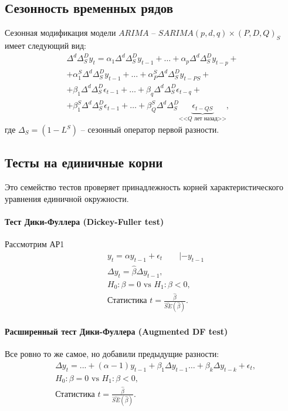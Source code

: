     \subsection{Сезонность временных рядов}
        Сезонная модификация модели $ARIMA$ -- $SARIMA(p, d, q)\times (P, D, Q)_S$ имеет следующий вид:
        \begin{multline}
            \Delta^d \Delta_S^D y_{t} =
                    \alpha_1 \Delta^d \Delta_S^D y_{t-1} + \dots + \alpha_p \Delta^d \Delta_S^D y_{t-p} + \\ +
                    \alpha_1^S \Delta^d \Delta_S^D y_{t-1} + \dots + \alpha_P^S \Delta^d \Delta_S^Dy_{t-PS} + \\ +
                    \beta_1 \Delta^d \Delta_S^D \epsilon_{t-1} + \dots + \beta_q \Delta^d \Delta_S^D \epsilon_{t-q} + \\ +
                    \beta_1^S \Delta^d \Delta_S^D \epsilon_{t-1} + \dots + \beta_Q^S \Delta^d \Delta_S^D \underbrace{\epsilon_{t-QS}}_{\text{<<$Q$ лет назад>>}},
        \end{multline} 
        где $\Delta_S = (1-L^S)$ -- сезонный оператор первой разности. 

    \subsection{Тесты на единичные корни}
        Это семейство тестов проверяет принадлежность корней характеристического уравнения единичной окружности.

        \paragraph{Тест Дики-Фуллера (Dickey-Fuller test)}
            Рассмотрим АР1
            \begin{align*}
                & y_t = \alpha y_{t-1} + \epsilon_t\qquad | -y_{t-1} \\
                & \Delta y_t = \hat\beta \Delta y_{t-1}, \\
                & H_0: \beta = 0\text{ vs }H_1: \beta < 0,\\
                & \text{Статистика } t = \frac{\hat\beta}{\hat{SE}(\hat\beta)}.
            \end{align*}

        \paragraph{Расширенный тест Дики-Фуллера (Augmented DF test)}
            Все ровно то же самое, но добавили предыдущие разности:
            \begin{align*}
                & \Delta y_t = ... + (\alpha-1) y_{t-1} + \beta_1 \Delta y_{t-1} \dots + \beta_k \Delta y_{t-k} + \epsilon_t, \\
                & H_0: \beta = 0\text{ vs }H_1: \beta < 0,\\
                & \text{Статистика } t = \frac{\hat\beta}{\hat{SE}(\hat\beta)}.
            \end{align*}

